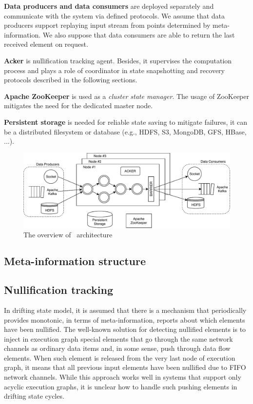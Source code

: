 {\bf Data producers and data consumers} are deployed separately and communicate with the system via defined protocols. We assume that data producers support replaying input stream from points determined by meta-information. We also suppose that data consumers are able to return the last received element on request.

{\bf Acker} is nullification tracking agent. Besides, it supervises the computation process and plays a role of coordinator in state snapshotting and recovery protocols described in the following sections.

{\bf Apache ZooKeeper} is used as a {\it cluster state manager}. The usage of ZooKeeper mitigates the need for the dedicated master node.

{\bf Persistent storage} is needed for reliable state saving to mitigate failures, it can be a distributed filesystem or database (e.g., HDFS, S3, MongoDB, GFS, HBase, ...).

\begin{figure}[htbp]
  \centering
  \includegraphics[scale=0.78]{pics/arch}
  \caption{The overview of \FlameStream\ architecture}
  \label {arch}
\end{figure}

\subsection{Meta-information structure}

\subsection{Nullification tracking}

In drifting state model, it is assumed that there is a mechanism that periodically provides monotonic, in terms of meta-information, reports about which elements have been nullified. The well-known solution for detecting nullified elements is to inject in execution graph special elements that go through the same network channels as ordinary data items and, in some sense, push through data flow elements. When such element is released from the very last node of execution graph, it means that all previous input elements have been nullified due to FIFO network channels. While this approach works well in systems that support only acyclic execution graphs, it is unclear how to handle such pushing elements in drifting state cycles. 

